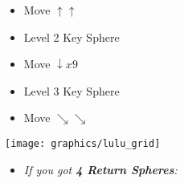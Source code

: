 \begin{spheregrid}
    \begin{multicols}{2}
        \begin{itemize}
            \luluf
            \begin{itemize}
                \item Move $\uparrow\uparrow$
                \item Level 2 Key Sphere
                \item Move $\downarrow x9$
                \item Level 3 Key Sphere
                \item Move $\searrow\searrow$
            \end{itemize}
            \texttt{[image: graphics/lulu\_grid]}
            \yunaf
            \begin{itemize}
                \item \textit{If you got \textbf{4 Return Spheres}:}
                    \begin{itemize}
                    \end{itemize}
                

\end{itemize}
\end{itemize}
\end{multicols}
\end{spheregrid}
